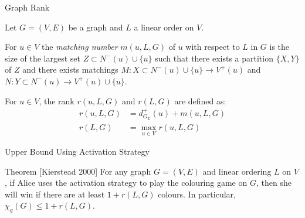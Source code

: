 \documentclass{beamer}
\begin{document}
\begin{frame}{\secname}{Graph Rank}
    
    
    
%    
    
      
    Let $G=(V,E)$ be a graph and $L$ a linear order on $V$.
    
    \begin{definition} 
    For $u \in V$ the \textit{matching number} $m(u, L, G)$ of $u$ with respect to $L$ in $G$ is the size of the largest set $Z \subset N^-(u)\cup\{u\}$ such that there exists a partition $\{X, Y\}$ of $Z$ and there exists matchings $M:X\subset N^-(u)\cup\{u\} \to V^+(u)$ and $N:Y\subset N^-(u)\to V^+(u)\cup\{u\}$.
    \end{definition}
    
    \pause
    
    \begin{definition}[Rank]
    For $u\in V$, the rank $r(u,L,G)$ and $r(L,G)$ are defined as:
    \begin{align*}
    r(u,L,G) & = d^+_{G_L}(u) + m(u,L,G) \\
    r(L,G)   & = \max_{u \in V}r(u,L,G)  
    \end{align*}
\end{definition}
\end{frame}


\begin{frame}{\secname}{Upper Bound Using Activation Strategy}
    
    \begin{block}{Theorem [Kierstead 2000]}
        For any graph $G=(V,E)$ and linear ordering $L$ on $V$, if Alice uses the activation strategy to play the colouring game on $G$, then she will win if there are at least $1+r(L, G)$ colours. In particular, $\chi_g(G) \leq 1+r(L, G)$.
    \end{block}
\end{frame}
\end{document}
